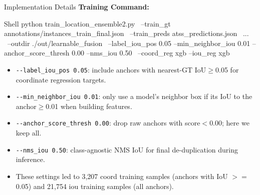 \documentclass[aspectratio=169]{beamer}
\begin{document}
\begin{frame}[fragile]{Implementation Details}
  \vspace{4pt}
  \textbf{Training Command:}
  \begin{block}{Shell}
python train\_location\_ensemble2.py \
  --train\_gt annotations/instances\_train\_final.json \
  --train\_preds atss\_predictions.json \
    ... \
  --outdir ./out/learnable\_fusion \
  --label\_iou\_pos 0.05 --min\_neighbor\_iou 0.01 --anchor\_score\_thresh 0.00 --nms\_iou 0.50 \
  --coord\_reg xgb --iou\_reg xgb
  \end{block}
  
  \begin{itemize}
    \item \verb|--label_iou_pos 0.05|: include anchors with nearest-GT IoU\(\ge\)\alert{0.05} for \alert{coordinate regression} targets.
    \item \verb|--min_neighbor_iou 0.01|: only use a model's neighbor box if its IoU to the anchor\(\ge\)\alert{0.01} when building features.
    \item \verb|--anchor_score_thresh 0.00|: drop raw anchors with score\(<\)\alert{0.00}; here we keep all.
    \item \verb|--nms_iou 0.50|: class-agnostic \alert{NMS IoU} for final de-duplication during inference.
  \item  These settings led to 3,207 coord training samples  (anchors with IoU $>=$ 0.05) and 21,754 iou training  samples (all anchors).
  \end{itemize}
\end{frame}
\end{document}
